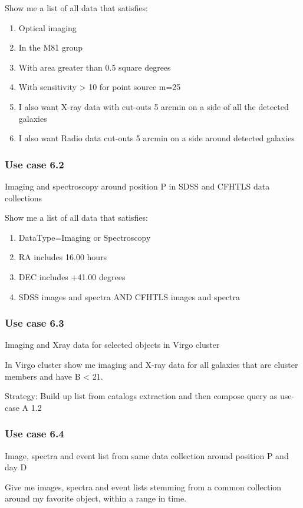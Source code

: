 \documentclass[11pt,a4paper]{ivoa}
\begin{document}
Show me a list of all data that satisfies:

\begin{enumerate}
\item Optical imaging
\item In the M81 group
\item With area greater than 0.5 square degrees
\item With sensitivity {\textgreater} 10 for point source m=25
\item I also want X-ray data with cut-outs 5 arcmin on a side of all the detected galaxies
\item I also want Radio data cut-outs 5 arcmin on a side around detected galaxies
\end{enumerate}
\subsubsection{Use case 6.2}
Imaging and spectroscopy around position P in SDSS and CFHTLS data collections

 Show me a list of all data that satisfies:

\begin{enumerate}
\item DataType=Imaging or Spectroscopy
\item RA includes 16.00 hours
\item DEC includes +41.00 degrees
\item SDSS images and spectra AND CFHTLS images and spectra
\end{enumerate}
\subsubsection{Use case 6.3}
Imaging and Xray data for selected objects in Virgo cluster

In Virgo cluster show me imaging and X-ray data for all galaxies that are cluster members and have B {\textless} 21.

Strategy: Build up list from catalogs extraction and then compose query as use-case A 1.2

\subsubsection{Use case 6.4}
Image, spectra and event list from same data collection around position P and day D

Give me images, spectra and event lists stemming from a common collection around my favorite object, within a range in
time.
\end{document}
